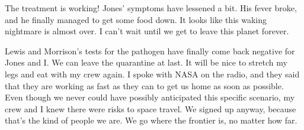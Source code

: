 \documentclass[main.tex]{subfiles}
\begin{document}
	The treatment is working!  Jones' symptoms have lessened a bit.  His fever broke, and he finally managed to
	get some food down.  It looks like this waking nightmare is almost over.  I can't wait until we get to leave
	this planet forever.  

	\begin{drama}
	\end{drama}
	
	Lewis and Morrison's tests for the pathogen have finally come back negative for Jones and I.  We can leave
	the quarantine at last.  It will be nice to stretch my legs and eat with my crew again.  I spoke with NASA on
	the radio, and they said that they are working as fast as they can to get us home as soon as possible.  Even
	though we never could have possibly anticipated this specific scenario, my crew and I knew there were risks
	to space travel.  We signed up anyway, because that's the kind of people we are.  We go where the frontier
	is, no matter how far.  
\end{document}
